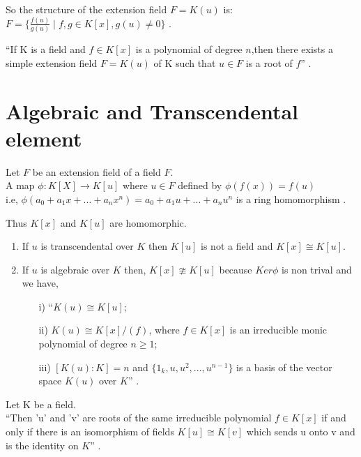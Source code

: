 So the structure of the extension field \(F=K(u)\) is:\\
\(F= \{\frac{f(u)}{g(u)} \;| \; f,g \in K[x],g(u) \neq 0\}\) \cite{hunger}.\\

\begin{theorem}
``If K is a field and \(f \in K[x]\) is a polynomial of degree \(n\),then there exists a simple extension field \(F=K(u)\) of K such that \(u\in F\) is a root of \(f\)'' \cite{hunger}.
\end{theorem}

\section{Algebraic and Transcendental element}
\begin{theorem}
Let \(F\) be an extension field of a field \(F\).\\
A map \(\phi:K[X] \rightarrow K[u]\) where \(u \in F\) defined by \(\phi (f(x))=f(u)\)\\
i.e, \(\phi (a_0+a_1x+...+a_nx^n)= a_0+a_1u+...+a_nu^n\) is a ring homomorphism \cite{hunger}.
\end{theorem}

Thus \( K[x]\) and \(K[u]\) are homomorphic.
  \begin{enumerate}
  \item If \(u\) is transcendental over \(K\) then \(K[u]\) is not a field and \(K[x] \cong K[u]\).
  \item If \(u\) is algebraic over \(K\) then, \(K[x] \ncong K[u]\) because \(Ker\phi\) is non trival and we have,
    \begin{enumerate}
    \item[i)] ``\(K(u) \cong K[u]\);
    \item[ii)] \(K(u) \cong K[x]/(f)\), where \(f \in K[x]\) is an irreducible monic polynomial of degree \(n \geq 1\);
    \item[iii)] \([K(u):K]=n\) and \(\{1_k,u,u^2,...,u^{n-1}\}\) is a basis of the vector space \(K(u)\) over \(K\)'' \cite{hunger}.
    \end{enumerate}
  \end{enumerate}

\begin{theorem}
 Let K be a field.\\
 ``Then 'u' and 'v' are  roots of the same irreducible polynomial \(f \in K[x]\) if and only if there is an isomorphism of fields \(K[u] \cong K[v]\) which sends u onto v and is the identity on \(K\)'' \cite{hunger}.
\end{theorem}



